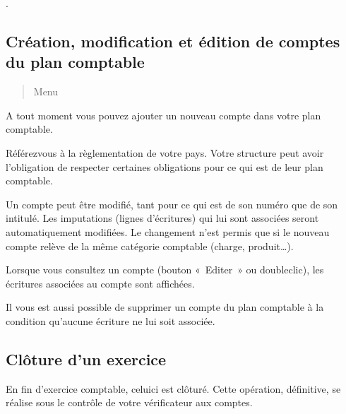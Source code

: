 \documentclass[a4paper,10pt,oneside,french]{sphinxmanual}
\begin{document}
\sphinxAtStartPar
{}
.


\subsection{Création, modification et édition de comptes du plan comptable}
\label{\detokenize{accounting/fiscalyear:creation-modification-et-edition-de-comptes-du-plan-comptable}}\begin{quote}

\sphinxAtStartPar
Menu 
\end{quote}

\sphinxAtStartPar
A tout moment vous pouvez ajouter un nouveau compte dans votre plan comptable.
\begin{quote}

\noindent{}
\end{quote}

\sphinxAtStartPar
Référez\sphinxhyphen{}vous à la règlementation de votre pays. Votre structure peut avoir l’obligation de respecter certaines obligations pour ce qui est de leur plan comptable.

\sphinxAtStartPar
Un compte peut être modifié, tant pour ce qui est de son numéro que de son intitulé. Les imputations (lignes d’écritures) qui lui sont associées seront automatiquement modifiées. Le changement n’est permis que si le nouveau compte relève de la même catégorie comptable (charge, produit…).

\sphinxAtStartPar
Lorsque vous consultez un compte (bouton « Editer » ou double\sphinxhyphen{}clic), les écritures associées au compte sont affichées.
\begin{quote}

\noindent{}
\end{quote}

\sphinxAtStartPar
Il vous est aussi possible de supprimer un compte du plan comptable à la condition qu’aucune écriture ne lui soit associée.


\subsection{Clôture d’un exercice}
\label{\detokenize{accounting/fiscalyear:cloture-d-un-exercice}}
\sphinxAtStartPar
En fin d’exercice comptable, celui\sphinxhyphen{}ci est clôturé. Cette opération, définitive, se réalise sous le contrôle de votre
vérificateur aux comptes.
\end{document}
